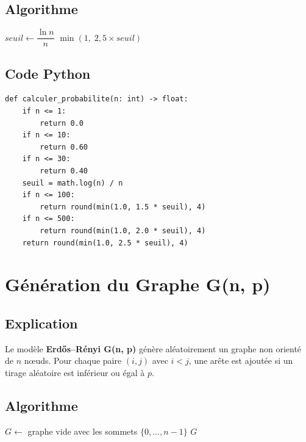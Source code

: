 \documentclass[12pt, a4paper]{article}
\begin{document}
\subsection{Algorithme}
\begin{algorithm}[H]
    \caption{Calcul adaptatif de p(n)}
    \KwOut{$p \in (0, 1]$ : probabilité adaptée}
    $\mathit{seuil} \leftarrow \dfrac{\ln n}{n}$\;
    \Retourner $\min(1,\; 2{,}5 \times \mathit{seuil})$\;
\end{algorithm}

\subsection{Code Python}
\begin{lstlisting}[style=python, caption={calculer\_probabilite(n)}]
def calculer_probabilite(n: int) -> float:
    if n <= 1:
        return 0.0
    if n <= 10:
        return 0.60
    if n <= 30:
        return 0.40
    seuil = math.log(n) / n
    if n <= 100:
        return round(min(1.0, 1.5 * seuil), 4)
    if n <= 500:
        return round(min(1.0, 2.0 * seuil), 4)
    return round(min(1.0, 2.5 * seuil), 4)
\end{lstlisting}

\section{Génération du Graphe G(n, p)}
\subsection{Explication}
\begin{tcolorbox}[explication]
    Le modèle \textbf{Erdős–Rényi G(n, p)} génère aléatoirement un graphe non orienté de $n$ nœuds. Pour chaque paire $(i, j)$ avec $i < j$, une arête est ajoutée si un tirage aléatoire est inférieur ou égal à $p$.
\end{tcolorbox}

\subsection{Algorithme}
\begin{algorithm}[H]
    \caption{Génération G(n, p)}
    $G \leftarrow$ graphe vide avec les sommets $\{0, \ldots, n-1\}$\;
    \Retourner $G$\;
\end{algorithm}
\end{document}
